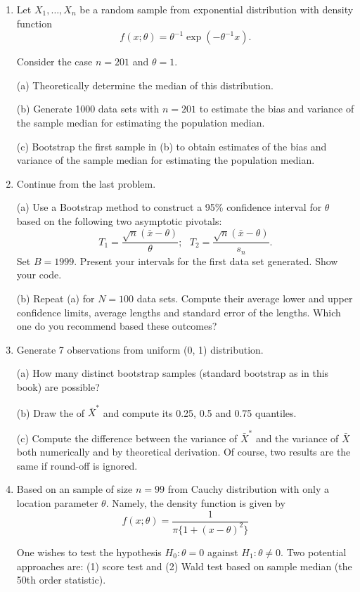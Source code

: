 \begin{enumerate}
\item
Let $X_1, \ldots, X_n$ be a random sample from exponential
distribution with density function
\[
f(x; \theta) = \theta^{-1} \exp ( - \theta^{-1} x).
\]

Consider the case $n=201$ and $\theta = 1$.

(a) Theoretically determine the median of this distribution.

(b) Generate 1000 data sets with $n=201$ to estimate the
bias and variance of the sample median for estimating
the population median.

(c) Bootstrap the first sample in (b) to obtain estimates of
the bias and variance of the sample median for estimating
the population median.

\item
Continue from the last problem. 

(a) 
Use a Bootstrap method to construct a 95\% 
confidence interval for $\theta$ based
on the following two asymptotic pivotals:
\[
T_1 = \frac{\sqrt{n}(\bar x - \theta)}{{\theta}}; ~~~
T_2 = \frac{\sqrt{n}(\bar x - \theta)}{s_n}.
\]
Set $B = 1999$. Present your intervals for the
first data set generated. Show your code.

(b) Repeat (a) for $N=100$ data sets. Compute their average
lower and upper confidence limits, average lengths and
standard error of the lengths. 
Which one do you recommend based these outcomes?

\item
Generate 7 observations from uniform (0, 1) distribution.

(a) How many distinct bootstrap samples (standard
bootstrap as in this book) are possible?

(b) Draw the \cdf of $\bar X^*$ and compute its 
0.25, 0.5 and 0.75 quantiles.

(c) Compute the difference between the variance of $\bar X^*$
and the variance of $\bar X$ both numerically and by theoretical
derivation. Of course, two results are the same if round-off is ignored.

\item
Based on an \iid sample of size $n=99$ from Cauchy distribution with only a location
parameter $\theta$. Namely, the density function is given by
\[
f(x; \theta) = \frac{1}{\pi\{1 + (x - \theta)^2\}}
\]

One wishes to test the hypothesis $H_0: \theta = 0$ against
$H_1: \theta \neq 0$. Two potential approaches are: 
(1) score test and
(2) Wald test based on sample median (the 50th order statistic).


\end{enumerate}
